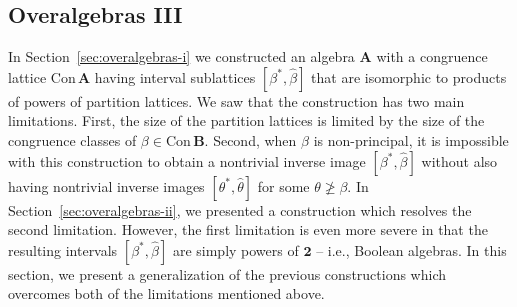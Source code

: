 \documentclass[cm,dissertation]{uhthesis}
\theoremstyle{plain}
\theoremstyle{definition}
\theoremstyle{remark}
\numberwithin{theorem}{section}
\numberwithin{claim}{chapter}
\numberwithin{equation}{section}
\numberwithin{conjecture}{chapter}
\newcommand{\<}{\ensuremath{\langle}}
\renewcommand{\>}{\ensuremath{\rangle}}
\renewcommand{\ngeq}{\ensuremath{\ngeqslant}}
\newcommand{\Con}{\ensuremath{\mathrm{Con\,}}}
\newcommand{\htheta}{\ensuremath{\hat{\theta}}}
\newcommand{\0}{\ensuremath{\mathbf{0}}}
\newcommand{\1}{\ensuremath{\mathbf{1}}}
\newcommand{\2}{\ensuremath{\mathbf{2}}}
\newcommand{\3}{\ensuremath{\mathbf{3}}}
\newcommand{\4}{\ensuremath{\mathbf{4}}}
\newcommand{\5}{\ensuremath{\mathbf{5}}}
\newcommand{\bA}{\ensuremath{\mathbf{A}}}
\newcommand{\bB}{\ensuremath{\mathbf{B}}}
\newcommand{\two}{\ensuremath{\mathbf{2}}}
\newcommand{\hbeta}{\ensuremath{\widehat{\beta}}}
\begin{document}
\subsection{Overalgebras III}
\label{sec:overalgebras-iii}
In Section~\ref{sec:overalgebras-i} we  constructed an algebra $\bA$ with
a congruence lattice $\Con \bA$ having interval sublattices $[\beta^*, \hbeta]$
that are isomorphic to products of powers of partition lattices.  We saw that the
construction has two main limitations.  First, the size of the partition
lattices is limited by the size of the congruence classes of $\beta \in
\Con\bB$.  Second, when $\beta$ is non-principal, it is impossible with this
construction to obtain a nontrivial inverse image $[\beta^*, \hbeta]$ without
also having nontrivial inverse images $[\theta^*, \htheta]$ for some $\theta \ngeq
\beta$.  In Section~\ref{sec:overalgebras-ii}, we presented a construction which
resolves the second limitation. However, the first limitation is even more
severe in that the resulting intervals $[\beta^*, \hbeta]$ are simply powers of
$\two$ -- i.e., Boolean algebras.  In this section, we present a generalization
of the previous constructions which overcomes both of the limitations mentioned above.
\end{document}
